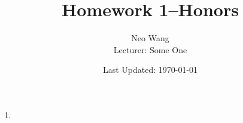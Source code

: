 \documentclass{scrreprt}
\title{Homework 1--Honors}
\author{Neo Wang\\ Lecturer: Some One}
\date{Last Updated: \today}
\begin{document}
\begin{enumerate}
	\item 
\end{enumerate}
\end{document}
